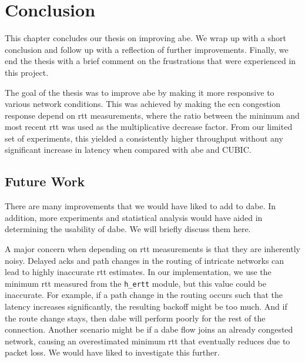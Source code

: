\chapter{Conclusion} \label{ch:conclusion}

This chapter concludes our thesis on improving \gls{abe}. We wrap up with a short conclusion and follow up with a reflection of further improvements. Finally, we end the thesis with a brief comment on the frustrations that were experienced in this project.


The goal of the thesis was to improve \gls{abe} by making it more responsive to various network conditions. This was achieved by making the \gls{ecn} congestion response depend on \gls{rtt} measurements, where the ratio between the minimum and most recent \gls{rtt} was used as the multiplicative decrease factor. From our limited set of experiments, this yielded a consistently higher throughput without any significant increase in latency when compared with \gls{abe} and CUBIC.









\section{Future Work}

There are many improvements that we would have liked to add to \gls{dabe}. In addition, more experiments and statistical analysis would have aided in determining the usability of \gls{dabe}. We will briefly discuss them here.

A major concern when depending on \gls{rtt} measurements is that they are inherently noisy. Delayed \gls{ack}s and path changes in the routing of intricate networks can lead to highly inaccurate \gls{rtt} estimates. In our implementation, we use the minimum \gls{rtt} measured from the \lstinline{h_ertt} module, but this value could be inaccurate. For example, if a path change in the routing occurs such that the latency increases significantly, the resulting backoff might be too much. And if the route change stays, then \gls{dabe} will perform poorly for the rest of the connection. Another scenario might be if a \gls{dabe} flow joins an already congested network, causing an overestimated minimum \gls{rtt} that eventually reduces due to packet loss. We would have liked to investigate this further.










